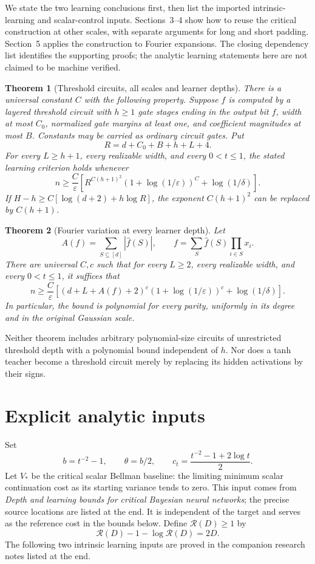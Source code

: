 \documentclass[11pt]{article}
\newtheorem{theorem}{Theorem}[section]
\theoremstyle{remark}\newtheorem{remark}[theorem]{Remark}
\begin{document}
We state the two learning conclusions first, then list the imported
intrinsic-learning and scalar-control inputs. Sections~3--4 show how to
reuse the critical construction at other scales, with separate arguments
for long and short padding. Section~5 applies the construction to Fourier
expansions. The closing dependency list identifies the supporting proofs;
the analytic learning statements here are not claimed to be machine verified.

\begin{theorem}[Threshold circuits, all scales and learner depths]
\label{thm:threshold}
There is a universal constant $C$ with the following property. Suppose
$f$ is computed by a layered threshold circuit with $h\ge1$ gate
stages ending in the output bit $f$, width at most $C_0$, normalized gate margins at least one, and
coefficient magnitudes at most $B$. Constants may be carried as
ordinary circuit gates. Put
\[
 R=d+C_0+B+h+L+4.
\]
For every $L\ge h+1$, every realizable width, and every $0<t\le1$,
the stated learning criterion holds whenever
\[
 n\ge \frac C\varepsilon\left[
 R^{C(h+1)^2}(1+\log(1/\varepsilon))^C+
 \log(1/\delta)\right].                         \tag{1}
\]
If $H-h\ge C[\log(d+2)+h\log R]$, the exponent
$C(h+1)^2$ can be replaced by $C(h+1)$.
\end{theorem}

\begin{theorem}[Fourier variation at every learner depth]
\label{thm:fourier}
Let
\[
 A(f)=\sum_{S\subseteq[d]}|\widehat f(S)|,
 \qquad f=\sum_S\widehat f(S)\prod_{i\in S}x_i.
\]
There are universal $C,c$ such that for every $L\ge2$, every
realizable width, and every $0<t\le1$, it suffices that
\[
 n\ge\frac C\varepsilon\left[
 (d+L+A(f)+2)^c(1+\log(1/\varepsilon))^c+
 \log(1/\delta)\right].                         \tag{2}
\]
In particular, the bound is polynomial for every parity, uniformly in
its degree and in the original Gaussian scale.
\end{theorem}

Neither theorem includes arbitrary polynomial-size circuits of
unrestricted threshold depth with a polynomial bound independent of
$h$. Nor does a tanh teacher become a threshold circuit merely by
replacing its hidden activations by their signs.

\section{Explicit analytic inputs}
Set
\[
 b=t^{-2}-1,\qquad \theta=b/2,\qquad
 c_t=\frac{t^{-2}-1+2\log t}{2}.
\]
Let $V_*$ be the critical scalar Bellman baseline: the limiting minimum
scalar continuation cost as its starting variance tends to zero. This
input comes from \emph{Depth and learning bounds for critical Bayesian
neural networks}; the precise source locations are listed at the end.
It is independent of the target and serves as the reference cost in the
bounds below. Define $\mathcal R(D)\ge1$ by
\[
 \mathcal R(D)-1-\log\mathcal R(D)=2D.
\]
The following two intrinsic learning inputs are proved in the
companion research notes listed at the end.
\end{document}
